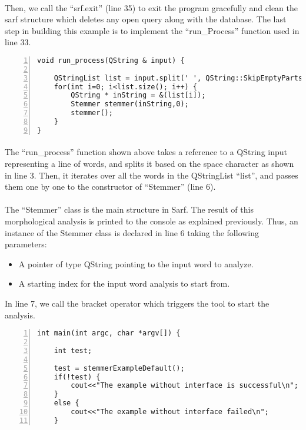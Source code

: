 \documentclass{article}
\begin{document}
\paragraph{}
Then,  we call the ``srf.exit'' (line 35) to exit the program gracefully and clean the sarf structure which deletes any open query along with the database. The last step in building this example is to implement the ``run\_Process'' function used in line 33.

\begin{Verbatim}[numbers=left]
void run_process(QString & input) {

    QStringList list = input.split(' ', QString::SkipEmptyParts);
    for(int i=0; i<list.size(); i++) {
        QString * inString = &(list[i]);
        Stemmer stemmer(inString,0);
        stemmer();
    }
}
\end{Verbatim}

\paragraph{}
The ``run\_process'' function shown above takes a reference to a QString input representing a line of words, and splits it based on the space character as shown in line 3. Then, it iterates over all the words in the QStringList ``list'', and passes them one by one to the constructor of ``Stemmer'' (line 6).

\paragraph{}
The ``Stemmer'' class is the main structure in Sarf. The result of this morphological analysis is printed to the console as explained previously. Thus, an instance of the Stemmer class is declared in line 6 taking the following parameters:
\begin{itemize}
\item A pointer of type QString pointing to the input word to analyze.
\item A starting index for the input word analysis to start from.
\end{itemize}
In line 7, we call the bracket operator which triggers the tool to start the analysis.

\begin{Verbatim}[numbers=left]
int main(int argc, char *argv[]) {

    int test;
    
    test = stemmerExampleDefault();
    if(!test) {
        cout<<"The example without interface is successful\n";
    }
    else {
        cout<<"The example without interface failed\n";
    }
\end{Verbatim}
\end{document}
